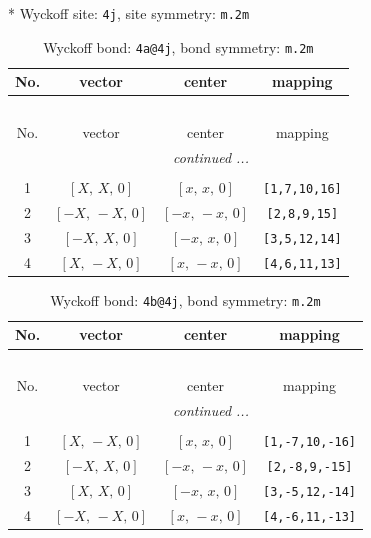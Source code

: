 \documentclass[fleqn,8pt]{jsarticle}
\begin{document}
* Wyckoff site: {\tt 4j}, site symmetry: {\tt m.2m}
\renewcommand{\arraystretch}{1.2}
\begin{longtable}{cccc}
\caption{Wyckoff bond: {\tt 4a@4j}, bond symmetry: {\tt m.2m}}
 \\
 \hline \hline
No. & vector & center & mapping \\ \hline \endfirsthead

\multicolumn{3}{l}{\tablename\ \thetable{}} \\
 \hline \hline
No. & vector & center & mapping \\ \hline \endhead

 \hline \hline
\multicolumn{3}{r}{\footnotesize\it continued ...} \\ \endfoot

 \hline \hline
\multicolumn{3}{r}{} \\ \endlastfoot

1 & $\left[ X,\, X,\, 0 \right]$ & $\left[ x,\, x,\, 0 \right]$ & {\tt [1,7,10,16]} \\ \hline
2 & $\left[ - X,\, - X,\, 0 \right]$ & $\left[ - x,\, - x,\, 0 \right]$ & {\tt [2,8,9,15]} \\ \hline
3 & $\left[ - X,\, X,\, 0 \right]$ & $\left[ - x,\, x,\, 0 \right]$ & {\tt [3,5,12,14]} \\ \hline
4 & $\left[ X,\, - X,\, 0 \right]$ & $\left[ x,\, - x,\, 0 \right]$ & {\tt [4,6,11,13]} \\
\end{longtable}
\renewcommand{\arraystretch}{1.2}
\begin{longtable}{cccc}
\caption{Wyckoff bond: {\tt 4b@4j}, bond symmetry: {\tt m.2m}}
 \\
 \hline \hline
No. & vector & center & mapping \\ \hline \endfirsthead

\multicolumn{3}{l}{\tablename\ \thetable{}} \\
 \hline \hline
No. & vector & center & mapping \\ \hline \endhead

 \hline \hline
\multicolumn{3}{r}{\footnotesize\it continued ...} \\ \endfoot

 \hline \hline
\multicolumn{3}{r}{} \\ \endlastfoot

1 & $\left[ X,\, - X,\, 0 \right]$ & $\left[ x,\, x,\, 0 \right]$ & {\tt [1,-7,10,-16]} \\ \hline
2 & $\left[ - X,\, X,\, 0 \right]$ & $\left[ - x,\, - x,\, 0 \right]$ & {\tt [2,-8,9,-15]} \\ \hline
3 & $\left[ X,\, X,\, 0 \right]$ & $\left[ - x,\, x,\, 0 \right]$ & {\tt [3,-5,12,-14]} \\ \hline
4 & $\left[ - X,\, - X,\, 0 \right]$ & $\left[ x,\, - x,\, 0 \right]$ & {\tt [4,-6,11,-13]} \\
\end{longtable}
\end{document}
